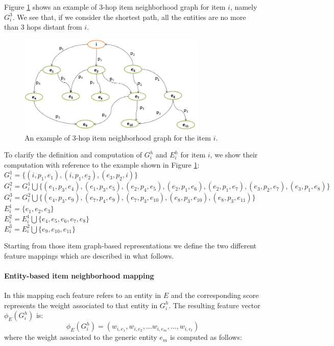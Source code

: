 Figure \ref{fig:graph-rec:Example} shows an example of 3-hop item neighborhood graph for item $i$, namely $G^3_i$. We see that, if we consider the shortest path, all the entities are no more than 3 hops distant from $i$. 
\begin{figure}
\begin{center}
\includegraphics[width=0.8\textwidth]{ch06_graph-rec/pics/item_neig.png}
\end{center}
\caption{An example of 3-hop item neighborhood graph for the item $i$.}
\label{fig:graph-rec:Example}
\end{figure}
To clarify the definition and computation of $G^h_i$ and $E^h_i$ for item $i$, we show their computation with reference to the example shown in Figure \ref{fig:graph-rec:Example}:\\ 
$G^1_i= \lbrace (i,p_1,e_1), (i,p_1,e_2), (e_3,p_2,i)\rbrace$\\ 
$G^2_i= G^1_i \bigcup \lbrace (e_1,p_3,e_4), (e_1,p_3,e_5), (e_2,p_4,e_5), (e_2,p_1,e_6),(e_2,p_1,e_7), (e_3,p_2,e_7), (e_3,p_1,e_8) \rbrace$\\
$G^3_i= G^2_i \bigcup \lbrace (e_4,p_3,e_9), (e_7,p_4,e_9), (e_7,p_3,e_{10}), (e_8,p_3,e_{10}),(e_8,p_3,e_{11}) \rbrace$\\
$E^1_i= \lbrace e_1, e_2, e_3 \rbrace$\\
$E^2_i=  E^1_i \bigcup  \lbrace e_4, e_5, e_6, e_7, e_8 \rbrace$\\
$E^3_i=  E^2_i \bigcup  \lbrace e_9, e_{10}, e_{11} \rbrace$

Starting from those item graph-based representations we define the two different feature mappings which are described in what follows.
\paragraph*{\textbf{Entity-based item neighborhood mapping}}
In this mapping each feature refers to an entity in $E$ and the corresponding score represents the weight associated to that entity in $G^h_i$. The resulting feature vector $\phi_E(G^h_i)$ is:
\[
\phi_E(G^h_i)=(w_{i,e_1} ,w_{i,e_2} ,...w_{i,e_m} ,...,w_{i,e_t} )
\]
where the weight associated to the generic entity $e_m$ is computed as follows:

